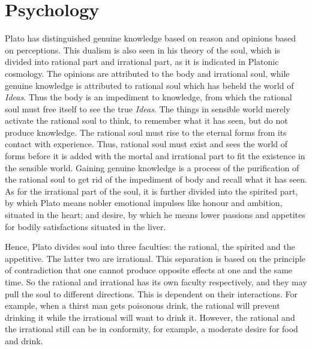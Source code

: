 \documentclass[11pt]{article}
\begin{document}
\begin{sloppypar}
\section{Psychology}
Plato has distinguished genuine knowledge based on reason and opinions based on perceptions. 
This dualism is also seen in his theory of the soul, which is divided into rational part and irrational part, as it is indicated in Platonic cosmology. 
The opinions are attributed to the body and irrational soul, while genuine knowledge is attributed to rational soul which has beheld the world of \textit{Ideas}. 
Thus the body is an impediment to knowledge, from which the rational soul must free itself to see the true \textit{Ideas}. 
The things in sensible world merely activate the rational soul to think, to remember what it has seen, but do not produce knowledge. 
The rational soul must rise to the eternal forms from its contact with experience. 
Thus, rational soul must exist and sees the world of forms before it is added with the mortal and irrational part to fit the existence in the sensible world. 
Gaining genuine knowledge is a process of the purification of the rational soul to get rid of the impediment of body and recall what it has seen. 
As for the irrational part of the soul, it is further divided into the spirited part, by which Plato means nobler emotional impulses like honour and ambition, situated in the heart; 
and desire, by which he means lower passions and appetites for bodily satisfactions situated in the liver.

\newline

Hence, Plato divides soul into three faculties: the rational, the spirited and the appetitive. 
The latter two are irrational. 
This separation is based on the principle of contradiction that one cannot produce opposite effects at one and the same time. 
So the rational and irrational has its own faculty respectively, and they may pull the soul to different directions. 
This is dependent on their interactions. 
For example, when a thirst man gets poisonous drink, the rational will prevent drinking it while the irrational will want to drink it. 
However, the rational and the irrational still can be in conformity, for example, a moderate desire for food and drink.
  

\end{sloppypar}
\end{document}
